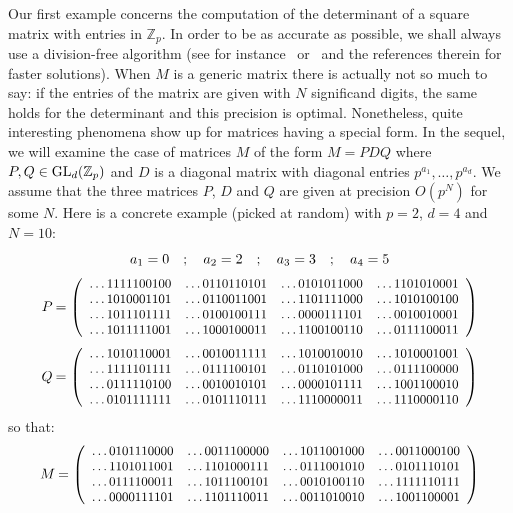 \documentclass[11pt]{article}
\numberwithin{equation}{section}
\numberwithin{figure}{section}
\theoremstyle{definition}
\newcommand{\Z}{\mathbb Z}
\newcommand{\Zp}{\Z_p}
\newcommand{\GL}{\text{\rm GL}}
\begin{document}
Our first example concerns the computation of the determinant of a 
square matrix with entries in $\Zp$. In order to be as accurate as
possible, we shall always use a division-free algorithm (see for
instance~\cite{Bi11} or~\cite{KaVi05} and the references therein for 
faster solutions).
When $M$ is a generic matrix there is actually not so much to say:
if the entries of the matrix are given with $N$ significand digits,
the same holds for the determinant and this precision is optimal.
Nonetheless, quite interesting phenomena show up for matrices having 
a special form. 
In the sequel, we will examine the case of matrices $M$ of the form $M 
= P D Q$ where $P, Q \in \GL_d(\Zp)$ and $D$ is a diagonal matrix with 
diagonal entries $p^{a_1}, \ldots, p^{a_d}$. We assume that the three
matrices $P$, $D$ and $Q$ are given at precision $O(p^N)$ for some $N$.
Here is a concrete example (picked at random) with $p=2$, $d=4$ and
$N = 10$:
$$\begin{array}{r@{\hspace{0.5ex}}l}
\multicolumn{2}{c}{
  a_1 = 0 \quad ; \quad
  a_2 = 2 \quad ; \quad
  a_3 = 3 \quad ; \quad
  a_4 = 5} \medskip \\
P & = 
\small \left(\begin{array}{rrrr}
\ldots1111100100 & \ldots0110110101 & \ldots0101011000 & \ldots1101010001 \\
\ldots1010001101 & \ldots0110011001 & \ldots1101111000 & \ldots1010100100 \\
\ldots1011101111 & \ldots0100100111 & \ldots0000111101 & \ldots0010010001 \\
\ldots1011111001 & \ldots1000100011 & \ldots1100100110 & \ldots0111100011
\end{array}\right) \medskip \\
Q & = 
\small \left(\begin{array}{rrrr}
\ldots1010110001 & \ldots0010011111 & \ldots1010010010 & \ldots1010001001 \\
\ldots1111101111 & \ldots0111100101 & \ldots0110101000 & \ldots0111100000 \\
\ldots0111110100 & \ldots0010010101 & \ldots0000101111 & \ldots1001100010 \\
\ldots0101111111 & \ldots0101110111 & \ldots1110000011 & \ldots1110000110
\end{array}\right)
\end{array}$$
so that:
\begin{equation}
\label{eq:matrixM}
\begin{array}{r@{\hspace{0.5ex}}l}
M & = 
\small \left(\begin{array}{rrrr}
\ldots0101110000 & \ldots0011100000 & \ldots1011001000 & \ldots0011000100 \\
\ldots1101011001 & \ldots1101000111 & \ldots0111001010 & \ldots0101110101 \\
\ldots0111100011 & \ldots1011100101 & \ldots0010100110 & \ldots1111110111 \\
\ldots0000111101 & \ldots1101110011 & \ldots0011010010 & \ldots1001100001
\end{array}\right)
\end{array}
\end{equation}
\end{document}
